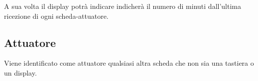 \documentclass[italian]{article}
\begin{document}
	A sua volta il display potrà indicare indicherà il numero di minuti dall'ultima ricezione di ogni scheda-attuatore.
    
%    
    
    \subsection*{Attuatore}
    
    Viene identificato come attuatore qualsiasi altra scheda che non sia una tastiera o un display. 
    
\end{document}
